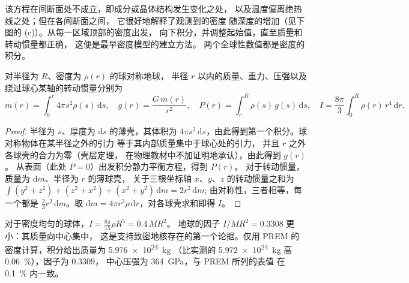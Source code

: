 该方程在间断面处不成立，即成分或晶体结构发生变化之处，
以及温度偏离绝热线之处；但在各间断面之间，
它很好地解释了观测到的密度
随深度的增加（见下图的 (c)）。从每一区域顶部的密度出发，
向下积分，并调整起始值，直至质量和转动惯量都正确，
这便是最早密度模型的建立方法。
两个全球性数值都是密度的积分。

\begin{proposition}[质量、重力、压强与转动惯量]
\label{prop:b1:layered-earth:integrals}
对半径为 $R$、密度为 $\rho(r)$ 的球对称地球，
半径 $r$ 以内的质量、重力、压强以及
绕过球心某轴的转动惯量分别为
\[
  m(r) = \int_0^r 4\pi s^2\rho(s)\,\mathrm ds, \quad
  g(r) = \frac{G\,m(r)}{r^2}, \quad
  P(r) = \int_r^R \rho(s)\,g(s)\,\mathrm ds, \quad
  I = \frac{8\pi}{3}\int_0^R \rho(r)\,r^4\,\mathrm dr.
\]
\end{proposition}

\begin{proof}
半径为 $s$、厚度为 $\mathrm ds$ 的薄壳，其体积为
$4\pi s^2\,\mathrm ds$，由此得到第一个积分。球对称物体在某半径之外的引力
等于其内部质量集中于球心处的引力，
并且 $r$ 之外各球壳的合力为零（壳层定理，
在物理教材中不加证明地承认），由此得到 $g(r)$。
从表面（此处 $P = 0$）出发积分静力平衡方程，得到 $P(r)$。
对于转动惯量，质量为 $\mathrm dm$、半径为 $r$ 的薄球壳，
关于三根坐标轴 $x$、$y$、$z$ 的转动惯量之和为
$\int (y^2 + z^2) + (z^2 + x^2) + (x^2 + y^2)\,\mathrm dm = 2r^2\,\mathrm dm$;
由对称性，三者相等，每一个都是 $\tfrac23 r^2\,\mathrm dm$。取
$\mathrm dm = 4\pi r^2\rho\,\mathrm dr$，对各球壳求和即得 $I$。
\end{proof}

对于密度均匀的球体，$I = \tfrac{8\pi}{15}\rho R^5 = 0.4\,MR^2$。
地球的因子 $I/MR^2 = 0.3308$ 更小：其质量向中心集中，
这是支持致密地核存在的第一个论据。仅用
PREM 的密度计算，积分给出质量为 \qty{5.976e24}{kg}
（比实测的 \qty{5.972e24}{kg} 高 \qty{0.06}{\percent}），因子为 $0.3309$，
中心压强为 \qty{364}{GPa}，与 PREM 所列的表值
在 \qty{0.1}{\percent} 内一致。

